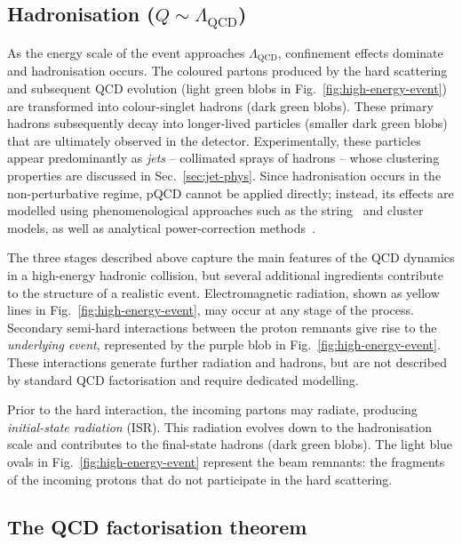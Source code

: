 \subsection{Hadronisation ($Q \sim \Lambda_{\mathrm{QCD}}$)}
\label{subsec:hadronisation}

As the energy scale of the event approaches $\Lambda_{\mathrm{QCD}}$,  confinement effects dominate and hadronisation occurs. The coloured partons produced by the hard scattering and subsequent QCD evolution (light green blobs in Fig.~\ref{fig:high-energy-event}) are transformed into colour-singlet hadrons (dark green blobs). These primary hadrons subsequently decay into longer-lived particles (smaller dark green blobs) that are ultimately observed in the detector. Experimentally, these particles appear predominantly as \emph{jets} -- collimated sprays of hadrons -- whose clustering properties are discussed in Sec.~\ref{sec:jet-phys}. Since hadronisation occurs in the 
non-perturbative regime, pQCD cannot be applied directly; instead, its 
effects are modelled using phenomenological approaches such as the 
string~\cite{Sjostrand:1982fn,Andersson:1983jt} and 
cluster~\cite{Webber:1983if} models, as well as analytical 
power-correction methods~\cite{Dokshitzer:1995qm}.

The three stages described above capture the main features of the QCD dynamics in a high-energy hadronic collision, but several additional ingredients contribute to the structure of a realistic event. Electromagnetic radiation, shown as yellow lines in Fig.~\ref{fig:high-energy-event}, may occur at any stage of the process. Secondary semi-hard interactions between the proton remnants give rise to the \emph{underlying event}, represented by the purple blob in Fig.~\ref{fig:high-energy-event}. These interactions generate further radiation and hadrons, but are not described by standard QCD factorisation and require dedicated modelling. 

Prior to the hard interaction, the incoming partons may radiate, producing \emph{initial-state radiation} (ISR). This radiation evolves down to the hadronisation scale and contributes to the final-state hadrons (dark green blobs). The light blue ovals in Fig.~\ref{fig:high-energy-event} represent the beam remnants: the fragments of the incoming protons that do not participate in the hard scattering.

\subsection{The QCD factorisation theorem}
\label{subsec:factorisation-formula}

